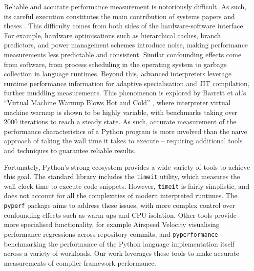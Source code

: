 Reliable and accurate performance measurement is notoriously difficult.
As such, its careful execution constitutes the main contribution of systems papers and theses \cite{crapeperformance} \cite{harris2021understanding}.
This difficulty comes from both sides of the hardware-software interface.
For example, hardware optimisations such as hierarchical caches, branch predictors, and power management schemes introduce noise, making performance measurements less predictable and consistent. Similar confounding effects come from software, from process scheduling in the operating system to garbage collection in language runtimes.
Beyond this, advanced interpreters leverage runtime performance information for adaptive specialisation and JIT compilation, further muddling measurements. This phenomenon is explored by Barrett et al.'s ``Virtual Machine Warmup Blows Hot and Cold'' \cite{barrettVirtualMachineWarmup2017}, where interpreter virtual machine warmup is shown to be highly variable, with benchmarks taking over 2000 iterations to reach a steady state.
As such, accurate measurement of the performance characteristics of a Python program is more involved than the na\"ive approach of taking the wall time it takes to execute -- requiring additional tools and techniques to guarantee reliable results.

Fortunately, Python's strong ecosystem provides a wide variety of tools to achieve this goal.
The standard library includes the \texttt{timeit} utility, which measures the wall clock time to execute code snippets. However, \texttt{timeit} is fairly simplistic, and does not account for all the complexities of modern interpreted runtimes.
The \texttt{pyperf} \cite{victorstinnerPsfPyperf2025} package aims to address these issues, with more complex control over confounding effects such as warm-ups and CPU isolation.
Other tools provide more specialised functionality, for example Airspeed Velocity \cite{michaeldroettboomAirspeedvelocityAsv2025} visualising performance regressions across repository commits, and \texttt{pyperformance} \cite{collinwinterPythonPyperformance2025} benchmarking the performance of the Python language implementation itself across a variety of workloads.
Our work leverages these tools to make accurate measurements of compiler framework performance.

